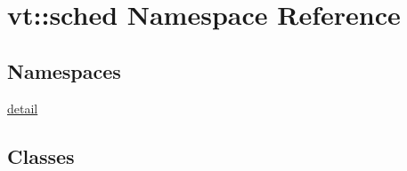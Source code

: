 \hypertarget{namespacevt_1_1sched}{}\section{vt\+:\+:sched Namespace Reference}
\label{namespacevt_1_1sched}
\subsection*{Namespaces}
\begin{DoxyCompactItemize}
\item 
 \hyperlink{namespacevt_1_1sched_1_1detail}{detail}
\end{DoxyCompactItemize}
\subsection*{Classes}
